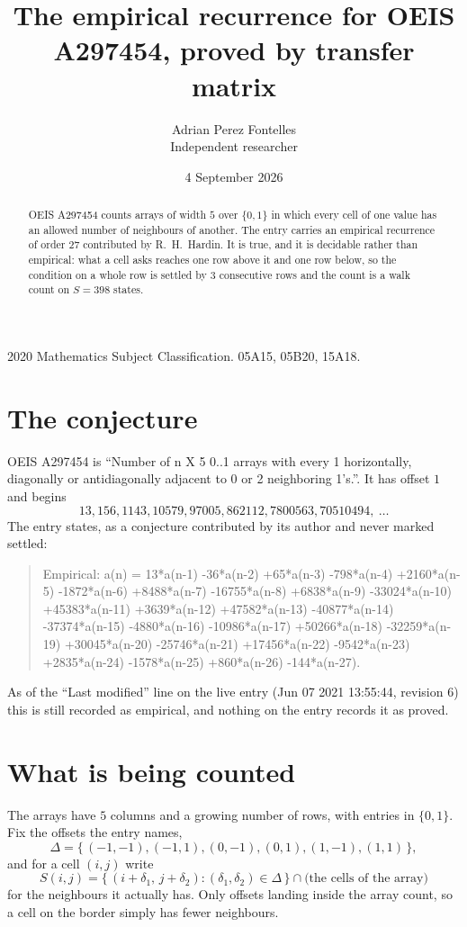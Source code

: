 \documentclass[11pt,a4paper]{article}
\title{The empirical recurrence for OEIS A297454, proved by transfer matrix}
\author{Adrian Perez Fontelles\\ \small Independent researcher}
\date{4 September 2026}
\theoremstyle{plain}
\theoremstyle{definition}
\begin{document}
\maketitle

\begin{abstract}
OEIS A297454 counts arrays of width $5$ over $\{0,1\}$ in which every cell of one value has an allowed number of neighbours of another. The entry carries an
empirical recurrence of order $27$ contributed by R.~H.~Hardin. It is true, and it is
decidable rather than empirical: what a cell asks reaches one row above it and one row below, so the
condition on a whole row is settled by $3$ consecutive rows and the count is a walk
count on $S=398$ states.
\end{abstract}

\noindent\small 2020 Mathematics Subject Classification. 05A15, 05B20, 15A18.\normalsize

\section{The conjecture}

OEIS A297454 is ``Number of n X 5 0..1 arrays with every 1 horizontally, diagonally or antidiagonally adjacent to 0 or 2 neighboring 1's.''. It has offset $1$ and begins
\[
13, 156, 1143, 10579, 97005, 862112, 7800563, 70510494,\ \dots
\]
The entry states, as a conjecture contributed by its author and never marked settled:
\begin{quote}
Empirical: a(n) = 13*a(n-1) -36*a(n-2) +65*a(n-3) -798*a(n-4) +2160*a(n-5) -1872*a(n-6) +8488*a(n-7) -16755*a(n-8) +6838*a(n-9) -33024*a(n-10) +45383*a(n-11) +3639*a(n-12) +47582*a(n-13) -40877*a(n-14) -37374*a(n-15) -4880*a(n-16) -10986*a(n-17) +50266*a(n-18) -32259*a(n-19) +30045*a(n-20) -25746*a(n-21) +17456*a(n-22) -9542*a(n-23) +2835*a(n-24) -1578*a(n-25) +860*a(n-26) -144*a(n-27).
\end{quote}
As of the ``Last modified'' line on the live entry (Jun 07 2021 13:55:44, revision 6) this is still
recorded as empirical, and nothing on the entry records it as proved.

\section{What is being counted}

The arrays have $5$ columns and a growing number of rows, with entries in $\{0,1\}$. Fix the
offsets the entry names,
\[
\Delta=\{\,(-1,-1), (-1,1), (0,-1), (0,1), (1,-1), (1,1)\,\},
\]
and for a cell $(i,j)$ write
\[
S(i,j)=\{\,(i+\delta_1,\,j+\delta_2) : (\delta_1,\delta_2)\in\Delta\,\}\cap
\text{(the cells of the array)}
\]
for the neighbours it actually has. Only offsets landing inside the array count, so a cell on
the border simply has fewer neighbours.
\end{document}
